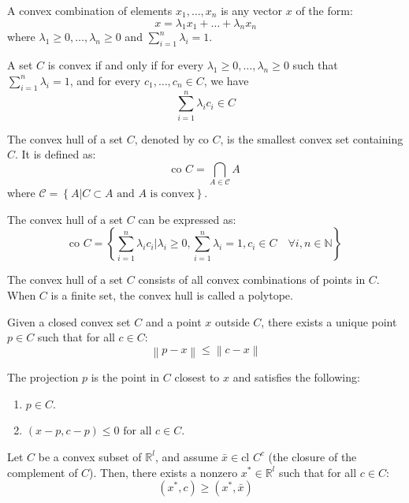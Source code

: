 \begin{definition}
    A convex combination of elements $x_1, \dots, x_n$ is any vector $x$ of the form:
    \[x = \lambda_1x_1 + \dots + \lambda_nx_n\]
    where $\lambda_1 \geq 0, \dots, \lambda_n \geq 0$ and $\sum_{i=1}^{n} \lambda_i = 1$.
\end{definition}
\begin{proposition}
    A set $C$ is convex if and only if for every $\lambda_1 \geq 0, \dots, \lambda_n \geq 0$ such that $\sum_{i=1}^{n}\lambda_i = 1$, and for every $c_1, \dots, c_n \in C$, we have 
    \[\sum^n_{i=1} \lambda_i c_i \in C\]
\end{proposition}
\begin{definition}
    The convex hull of a set $C$, denoted by $\text{co }C$, is the smallest convex set containing $C$. 
    It is defined as:
    \[\text{co }C =\bigcap_{A\in\mathcal{C}}A\]
    where $\mathcal{C} = \left\{A | C \subset A \text{ and } A \text{ is convex}\right\}$. 
\end{definition}
\begin{proposition}
    The convex hull of a set $C$ can be expressed as:
    \[\text{co }C=\left\{\sum_{i=1}^{n}\lambda_ic_i|\lambda_i\geq 0,\sum_{i=1}^{n}\lambda_i=1,c_i\in C\quad\forall i, n\in \mathbb{N}\right\}\]
\end{proposition}
The convex hull of a set $C$ consists of all convex combinations of points in $C$.
When $C$ is a finite set, the convex hull is called a polytope.
\begin{theorem}
    Given a closed convex set $C$ and a point $x$ outside $C$, there exists a unique point $p \in C$ such that for all $c \in C$:
    \[\left\lVert p - x\right\rVert\leq\left\lVert c-x\right\rVert\]
\end{theorem}
The projection $p$ is the point in $C$ closest to $x$ and satisfies the following:
\begin{enumerate}
    \item $p \in C$.
    \item $(x - p, c - p) \leq 0 \text{ for all } c \in C$.
\end{enumerate}
\begin{theorem}
    Let $C$ be a convex subset of $\mathbb{R}^l$, and assume $\bar{x} \in \text{cl } C^c$ (the closure of the complement of $C$).
    Then, there exists a nonzero $x^\ast \in \mathbb{R}^l$ such that for all $c \in C$:
    \[(x^\ast, c) \geq (x^\ast, \bar{x})\]
\end{theorem}
